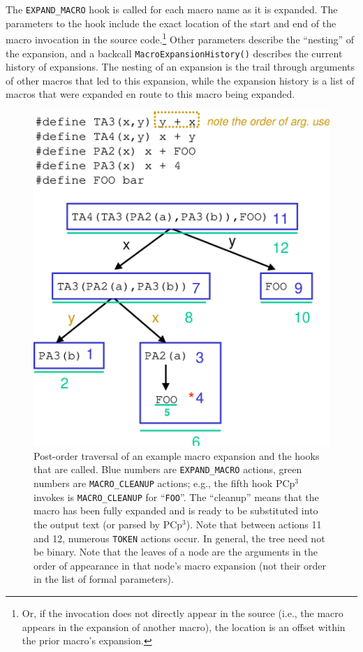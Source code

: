 \documentclass{article}
\newcommand{\pcp}{\mbox{\textsf{PCp}$^3$}}
\newcommand{\ie}{i.e.,}
\newcommand{\eg}{e.g.,}
\begin{document}
\noindent The \texttt{EXPAND\_MACRO} hook is called for each macro name as it is
expanded.  The parameters to the hook include the exact location of the
start and end of the macro invocation in the source code.\footnote{Or,
  if the invocation does not directly appear in the source (\ie{} the
  macro appears in the expansion of another macro), the location is an
  offset within the prior macro's expansion.}  Other parameters
describe the ``nesting'' of the expansion, and a backcall
\texttt{Macro\-Expansion\-History()} describes the current history of
expansions.  The nesting of an expansion is the trail through arguments
of other macros that led to this expansion, while the expansion history
is a list of macros that were expanded en route to this macro being
expanded.

\begin{figure}[p]
  \begin{center}
    \leavevmode
    \includegraphics[width=0.45\linewidth]{figs/tree-expn.eps}
    \caption{Post-order traversal of an example macro expansion and the
      hooks that are called. Blue numbers are \texttt{EXPAND\_MACRO}
      actions, green numbers are \texttt{MACRO\_CLEANUP} actions; \eg{}
      the fifth hook \pcp{} invokes is \texttt{MACRO\_CLEANUP} for
      ``\texttt{FOO}''.  The ``cleanup'' means that the macro has been
      fully expanded and is ready to be substituted into the output text
      (or parsed by \pcp{}). Note that between actions 11 and 12, numerous
      \texttt{TOKEN} actions occur.  In general, the tree need not be
      binary. Note that the leaves of a node are the arguments in
      the order of appearance in that node's macro expansion (not their
      order in the list of formal parameters).}
    \label{fig:tree-expn}
  \end{center}
\end{figure}
\end{document}

